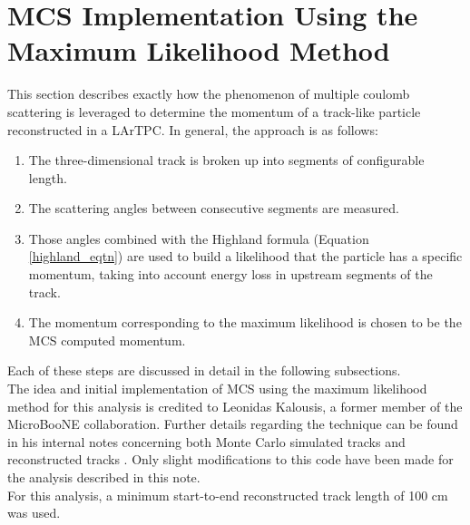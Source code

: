 \section{MCS Implementation Using the Maximum Likelihood Method}\label{MCS_technique_section}

This section describes exactly how the phenomenon of multiple coulomb scattering is leveraged to determine the momentum of a track-like particle reconstructed in a LArTPC. In general, the approach is as follows:
\begin{enumerate}
\item The three-dimensional track is broken up into segments of configurable length.
\item The scattering angles between consecutive segments are measured.
\item Those angles combined with the Highland formula (Equation \ref{highland_eqtn}) are used to build a likelihood that the particle has a specific momentum, taking into account energy loss in upstream segments of the track.
\item The momentum corresponding to the maximum likelihood is chosen to be the MCS computed momentum.
\end{enumerate}
Each of these steps are discussed in detail in the following subsections.\\

The idea and initial implementation of MCS using the maximum likelihood method for this analysis is credited to Leonidas Kalousis, a former member of the MicroBooNE collaboration. Further details regarding the technique can be found in his internal notes concerning both Monte Carlo simulated tracks \cite{leonidas1} and reconstructed tracks \cite{leonidas2}. Only slight modifications to this code have been made for the analysis described in this note.\\

For this analysis, a minimum start-to-end reconstructed track length of 100 cm was used.%

